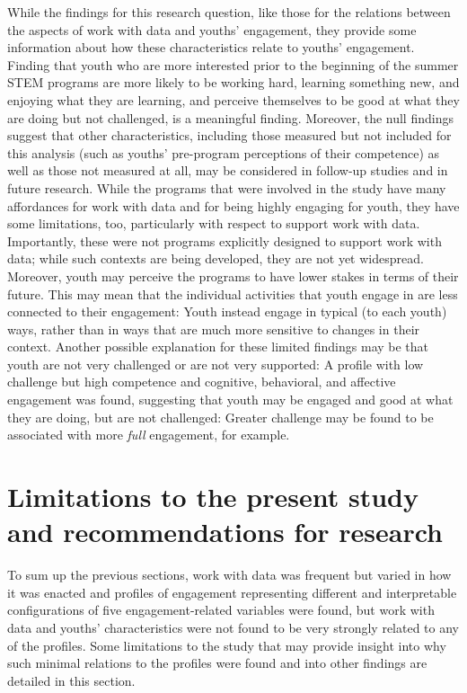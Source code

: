 \documentclass[]{msu-thesis}
\theoremstyle{definition}
\theoremstyle{definition}
\theoremstyle{definition}
\theoremstyle{remark}
\begin{document}
While the findings for this research question, like those for the
relations between the aspects of work with data and youths' engagement,
they provide some information about how these characteristics relate to
youths' engagement. Finding that youth who are more interested prior to
the beginning of the summer STEM programs are more likely to be working
hard, learning something new, and enjoying what they are learning, and
perceive themselves to be good at what they are doing but not
challenged, is a meaningful finding. Moreover, the null findings suggest
that other characteristics, including those measured but not included
for this analysis (such as youths' pre-program perceptions of their
competence) as well as those not measured at all, may be considered in
follow-up studies and in future research. While the programs that were
involved in the study have many affordances for work with data and for
being highly engaging for youth, they have some limitations, too,
particularly with respect to support work with data. Importantly, these
were not programs explicitly designed to support work with data; while
such contexts are being developed, they are not yet widespread.
Moreover, youth may perceive the programs to have lower stakes in terms
of their future. This may mean that the individual activities that youth
engage in are less connected to their engagement: Youth instead engage
in typical (to each youth) ways, rather than in ways that are much more
sensitive to changes in their context. Another possible explanation for
these limited findings may be that youth are not very challenged or are
not very supported: A profile with low challenge but high competence and
cognitive, behavioral, and affective engagement was found, suggesting
that youth may be engaged and good at what they are doing, but are not
challenged: Greater challenge may be found to be associated with more
\emph{full} engagement, for example.

\section{Limitations to the present study and recommendations for
research}\label{limitations-to-the-present-study-and-recommendations-for-research}

To sum up the previous sections, work with data was frequent but varied
in how it was enacted and profiles of engagement representing different
and interpretable configurations of five engagement-related variables
were found, but work with data and youths' characteristics were not
found to be very strongly related to any of the profiles. Some
limitations to the study that may provide insight into why such minimal
relations to the profiles were found and into other findings are
detailed in this section.
\end{document}
